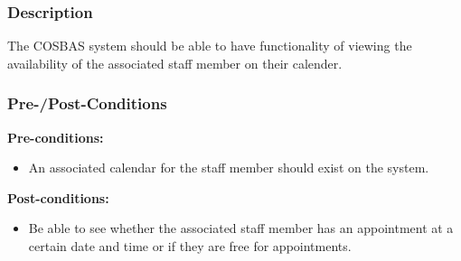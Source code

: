 	\subsubsection{Description}
	The COSBAS system should be able to have functionality of viewing the availability of the associated staff member on their calender.
	\subsubsection{Pre-/Post-Conditions}
		\textbf{Pre-conditions:} 
			\begin{itemize}
				\item An associated calendar for the staff member should exist on the system. 
			\end{itemize}
		\textbf{Post-conditions:} 
			\begin{itemize}
				\item Be able to see whether the associated staff member has an appointment at a certain date and time or if they are free for appointments. 
			\end{itemize}